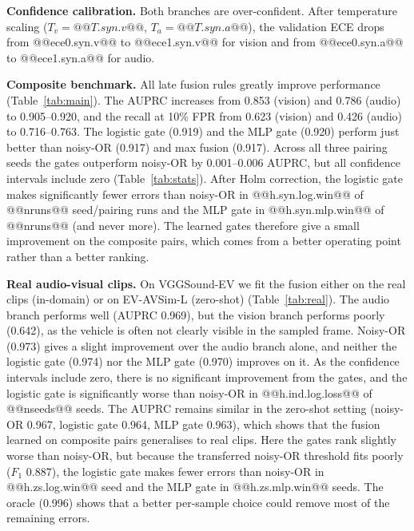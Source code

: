 \documentclass[runningheads,a4paper]{llncs}
\begin{document}
\textbf{Confidence calibration.} Both branches are over-confident. After
temperature scaling ($T_v = @@T.syn.v@@$, $T_a = @@T.syn.a@@$), the validation
ECE drops from @@ece0.syn.v@@ to @@ece1.syn.v@@ for vision and from
@@ece0.syn.a@@ to @@ece1.syn.a@@ for audio.

\textbf{Composite benchmark.} All late fusion rules greatly improve
performance (Table~\ref{tab:main}). The AUPRC increases from 0.853 (vision) and
0.786 (audio) to 0.905--0.920, and the recall at 10\% FPR from 0.623 (vision)
and 0.426 (audio) to 0.716--0.763. The logistic gate (0.919) and the MLP gate
(0.920) perform just better than noisy-OR (0.917) and max fusion (0.917).
Across all three pairing seeds the gates outperform noisy-OR by 0.001--0.006
AUPRC, but all confidence intervals include zero (Table~\ref{tab:stats}).
After Holm correction, the logistic gate makes significantly fewer errors than
noisy-OR in @@h.syn.log.win@@ of @@nruns@@ seed/pairing runs and the MLP gate in
@@h.syn.mlp.win@@ of @@nruns@@ (and never more). The learned gates therefore
give a small improvement on the composite pairs, which comes from a better
operating point rather than a better ranking.

\textbf{Real audio-visual clips.} On VGGSound-EV we fit the fusion either on
the real clips (in-domain) or on EV-AVSim-L (zero-shot) (Table~\ref{tab:real}).
The audio branch performs well (AUPRC 0.969), but the vision branch performs
poorly (0.642), as the vehicle is often not clearly visible in the sampled
frame. Noisy-OR (0.973) gives a slight improvement over the audio branch
alone, and neither the logistic gate (0.974) nor the MLP gate (0.970) improves
on it. As the confidence intervals include zero, there is no significant
improvement from the gates, and the logistic gate is significantly worse than
noisy-OR in @@h.ind.log.loss@@ of @@nseeds@@ seeds. The AUPRC remains similar in
the zero-shot setting (noisy-OR 0.967, logistic gate 0.964, MLP gate 0.963),
which shows that the fusion learned on composite pairs generalises to real
clips. Here the gates rank slightly worse than noisy-OR, but because the
transferred noisy-OR threshold fits poorly ($F_1$ 0.887), the logistic gate
makes fewer errors than noisy-OR in @@h.zs.log.win@@ seed and the MLP gate in
@@h.zs.mlp.win@@ seeds. The oracle (0.996) shows that a better per-sample choice
could remove most of the remaining errors.

\begin{table}[htbp]
\centering
\caption{VGGSound-EV test results (1,834 real clips), mean $\pm$ s.d.\ over
@@nseeds@@ seeds; fusion fitted on VGGSound-EV (in-domain) or EV-AVSim-L
(zero-shot). Bold: best non-oracle value.}
\label{tab:real}
\end{table}
\end{document}
